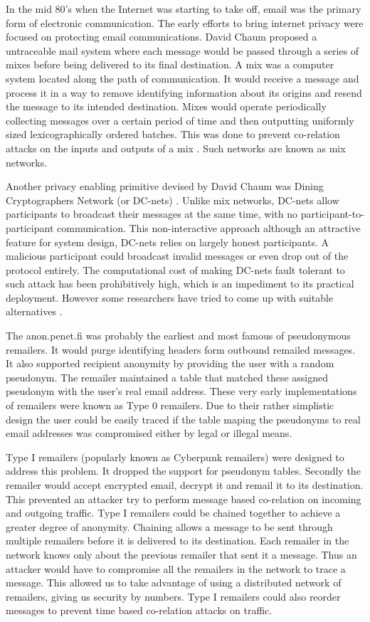 \documentclass{llncs}
\begin{document}
In the mid 80's when the Internet was starting to take off, email was the primary form of electronic communication. The early efforts to bring internet privacy were focused on protecting email communications. David Chaum proposed a untraceable mail system where each message would be passed through a series of mixes before being delivered to its final destination. A mix was a computer system located along the path of communication. It would receive a message and process it in a way to remove identifying information about its origins and resend the message to its intended destination. Mixes would operate periodically collecting messages over a certain period of time and then outputting uniformly sized lexicographically ordered batches. This was done to prevent co-relation attacks on the inputs and outputs of a mix \cite{chaum-mix}. Such networks are known as mix networks.

Another privacy enabling primitive devised by David Chaum was Dining Cryptographers Network (or DC-nets) \cite{chaum-dc}. Unlike mix networks, DC-nets allow participants to broadcast their messages at the same time, with no participant-to-participant communication. This non-interactive approach although an attractive feature for system design, DC-nets relies on largely honest participants. A malicious participant could broadcast invalid messages or even drop out of the protocol entirely. The computational cost of making DC-nets fault tolerant to such attack has been prohibitively high, which is an impediment to its practical deployment. However some researchers have tried to come up with suitable alternatives \cite{golle:eurocrypt2004}.

The anon.penet.fi was probably the earliest and most famous of pseudonymous remailers. It would purge identifying headers form outbound remailed messages. It also supported recipient anonymity by providing the user with a random pseudonym. The remailer maintained a table that matched these assigned pseudonym with the user's real email address. These very early implementations of remailers were known as Type 0 remailers. Due to their rather simplistic design the user could be easily traced if the table maping the pseudonyms to real email addresses was compromised either by legal or illegal means.

Type I remailers (popularly known as Cyberpunk remailers) were designed to address this problem. It dropped the support for pseudonym tables. Secondly the remailer would accept encrypted email, decrypt it and remail it to its destination. This prevented an attacker try to perform message based co-relation on incoming and outgoing traffic. Type I remailers could be chained together to achieve a greater degree of anonymity. Chaining allows a message to be sent through multiple remailers before it is delivered to its destination. Each remailer in the network knows only about the previous remailer that sent it a message. Thus an attacker would have to compromise all the remailers in the network to trace a message. This allowed us to take advantage of using a distributed network of remailers, giving us security by numbers. Type I remailers could also reorder messages to prevent time based co-relation attacks on traffic.
\end{document}
